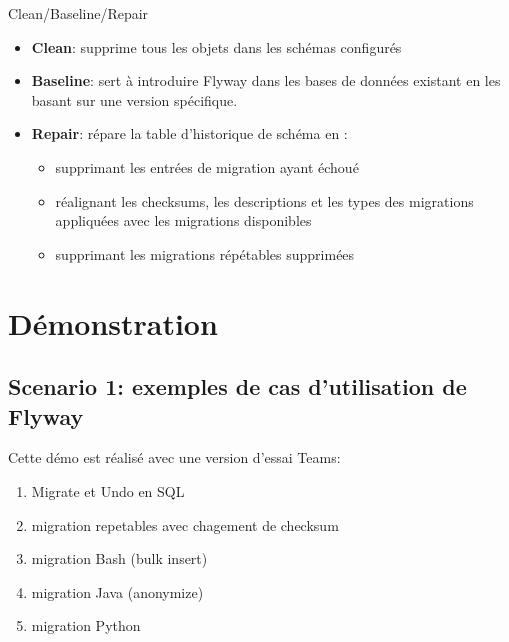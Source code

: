 \documentclass[slidestop,compress,11pt,xcolor=dvipsnames,french]{beamer}
\begin{document}
\begin{frame}{Clean/Baseline/Repair}
\vspace{1cm}
\begin{itemize}
 \item \textbf{Clean}: supprime tous les objets dans les schémas configurés
 \item \textbf{Baseline}: sert à introduire Flyway dans les bases de données existant en les basant sur une version spécifique.
 \item \textbf{Repair}: répare la table d'historique de schéma en :
    \begin{itemize}
        \item supprimant les entrées de migration ayant échoué
        \item réalignant les checksums, les descriptions et les types des migrations appliquées avec les migrations disponibles
        \item supprimant les migrations répétables supprimées
    \end{itemize}
\end{itemize}
\end{frame}

\section[Démo]{Démonstration}
\subsection*{Scenario 1: exemples de cas d'utilisation de Flyway }
\begin{frame}
Cette démo est réalisé avec une version d'essai Teams:
\begin{enumerate}
 \item Migrate et Undo en SQL 
 \item migration repetables avec chagement de checksum
 \item migration Bash (bulk insert)
 \item migration Java (anonymize)
 \item migration Python 
\end{enumerate}
\end{frame}
\end{document}
